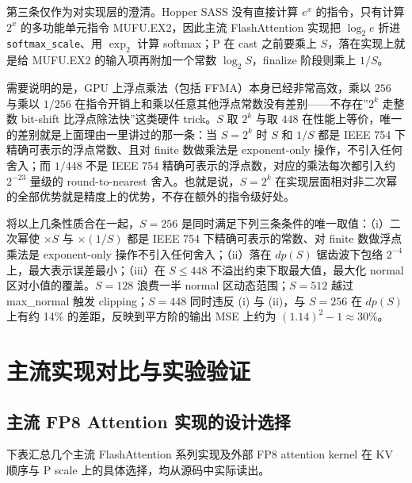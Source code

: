 第三条仅作为对实现层的澄清。Hopper SASS 没有直接计算 $e^x$ 的指令，只有计算 $2^x$ 的多功能单元指令 MUFU.EX2，因此主流 FlashAttention 实现把 $\log_2 e$ 折进 \lstinline|softmax_scale|、用 $\exp_2$ 计算 softmax；P 在 cast 之前要乘上 $S$，落在实现上就是给 MUFU.EX2 的输入项再附加一个常数 $\log_2 S$，finalize 阶段则乘上 $1/S$。

需要说明的是，GPU 上浮点乘法（包括 FFMA）本身已经非常高效，乘以 $256$ 与乘以 $1/256$ 在指令开销上和乘以任意其他浮点常数没有差别——不存在”$2^k$ 走整数 bit-shift 比浮点除法快”这类硬件 trick。$S$ 取 $2^k$ 与取 $448$ 在性能上等价，唯一的差别就是上面理由一里讲过的那一条：当 $S = 2^k$ 时 $S$ 和 $1/S$ 都是 IEEE 754 下精确可表示的浮点常数、且对 finite 数做乘法是 exponent-only 操作，不引入任何舍入；而 $1/448$ 不是 IEEE 754 精确可表示的浮点数，对应的乘法每次都引入约 $2^{-23}$ 量级的 round-to-nearest 舍入。也就是说，$S = 2^k$ 在实现层面相对非二次幂的全部优势就是精度上的优势，不存在额外的指令级好处。

将以上几条性质合在一起，$S = 256$ 是同时满足下列三条条件的唯一取值：（i）二次幂使 $\times S$ 与 $\times (1/S)$ 都是 IEEE 754 下精确可表示的常数、对 finite 数做浮点乘法是 exponent-only 操作不引入任何舍入；（ii）落在 $dp(S)$ 锯齿波下包络 $2^{-4}$ 上，最大表示误差最小；（iii）在 $S \le 448$ 不溢出约束下取最大值，最大化 normal 区对小值的覆盖。$S = 128$ 浪费一半 normal 区动态范围；$S = 512$ 越过 max\_normal 触发 clipping；$S = 448$ 同时违反 (i) 与 (ii)，与 $S = 256$ 在 $dp(S)$ 上有约 14\% 的差距，反映到平方阶的输出 MSE 上约为 $(1.14)^2 - 1 \approx 30\%$。

\section{主流实现对比与实验验证}

\subsection{主流 FP8 Attention 实现的设计选择}

下表汇总几个主流 FlashAttention 系列实现及外部 FP8 attention kernel 在 KV 顺序与 P scale 上的具体选择，均从源码中实际读出。


